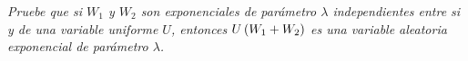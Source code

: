 \emph{
	Pruebe que si $W_1$ y $W_2$  son  exponenciales de par\'ametro 
	$\lambda$  independientes entre si y de una variable uniforme $U$, 
	entonces $U\left( W_1+W_2\right) $ es una variable aleatoria exponencial 
	de par\'ametro $\lambda$.
}